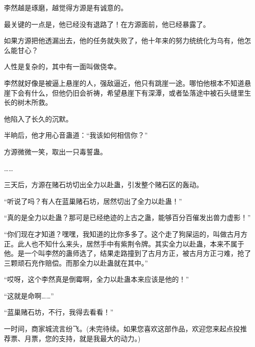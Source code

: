 \begin{this_body}
李然越是琢磨，越觉得方源是有诚意的。

最关键的一点是，他已经没有退路了！在方源面前，他已经暴露了。

如果方源把他透漏出去，他的任务就失败了，他十年来的努力统统化为乌有，他怎么能甘心？

人性是复杂的，其中有一面叫做侥幸。

李然就好像是被逼上悬崖的人，强敌逼近，他只有跳崖一途。哪怕他根本不知道悬崖下会有什么，但他仍旧会祈祷，希望悬崖下有深潭，或者坠落途中被石头缝里生长的树木所救。

他陷入了长久的沉默。

半晌后，他才用心音蛊道：“我该如何相信你？”

方源微微一笑，取出一只毒誓蛊。

……

三天后，方源在赌石坊切出全力以赴蛊，引发整个赌石区的轰动。

“听说了吗？有人在蓝巢赌石坊，居然切出了全力以赴蛊！”

“真的是全力以赴蛊？那可是已经绝迹的上古之蛊，能够百分百催发出兽力虚影！”

“你们现在才知道？嘿嘿，我知道的比你多多了。这个走了狗屎运的，叫做古月方正。此人也不知什么来头，居然手中有紫荆令牌。其实全力以赴蛊，本来不属于他。是一个叫李然的蛊师选了，结果走路撞到了古月方正，被古月方正刁难，抢了三颗顽石充作赔偿。而那全力以赴蛊就在其中。”

“哎呀，这个李然真是倒霉啊，全力以赴蛊本来应该是他的！”

“这就是命啊……”

“蓝巢赌石坊，不行，我得去看看！”

一时间，商家城流言纷飞。(未完待续。如果您喜欢这部作品，欢迎您来起点投推荐票、月票，您的支持，就是我最大的动力。)

\end{this_body}

